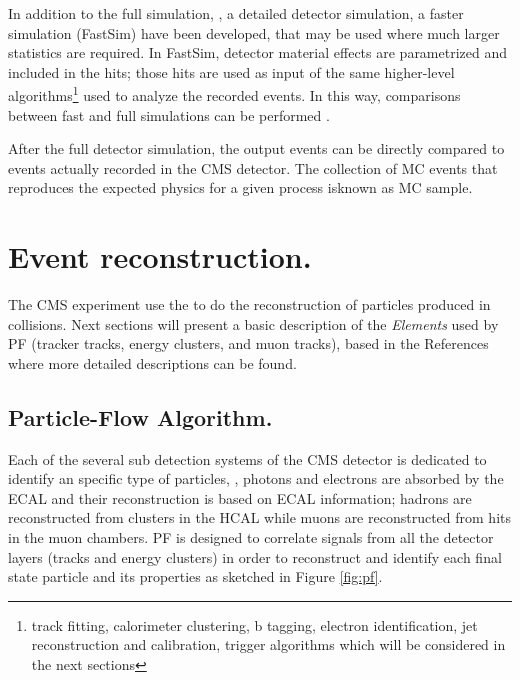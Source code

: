 In addition to the full simulation, \ie, a detailed detector simulation, a faster simulation (FastSim) have been developed, that may be used where much larger statistics are required. In FastSim, detector material effects are parametrized and included in the hits; those hits are used as input of the same higher-level algorithms\footnote{track fitting, calorimeter clustering, b tagging, electron identification, jet reconstruction and calibration, trigger algorithms which will be considered in the next sections} used to analyze the recorded events. In this way, comparisons between fast and full simulations can be performed \cite{fastsim}.

After the full detector simulation, the output events can be directly compared to events actually recorded in the CMS detector. The collection of MC events that reproduces the expected physics for a given process isknown as MC sample.

\section{Event reconstruction.}

The CMS experiment use the  to do the reconstruction of particles produced in \pp collisions. Next sections will present a basic description of the \textit{Elements} used by PF (tracker tracks, energy clusters, and muon tracks), based in the References \cite{particle_flow, particle_flow2} where more detailed descriptions can be found.  

\subsection{Particle-Flow Algorithm.}

Each of the several sub detection systems of the CMS detector is dedicated to identify an specific type of particles, \ie, photons and electrons are absorbed by the ECAL and their reconstruction is based on ECAL information; hadrons are reconstructed from clusters in the HCAL while muons are reconstructed from hits in the muon chambers. PF is designed to correlate signals from all the detector layers (tracks and energy clusters) in order to reconstruct and identify each final state particle and its properties as sketched in Figure \ref{fig:pf}.


